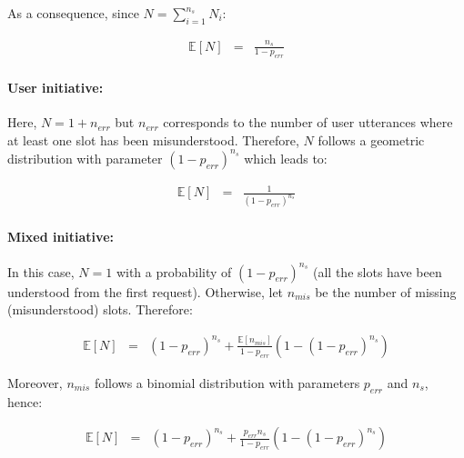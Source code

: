                      As a consequence, since $N = \sum_{i=1}^{n_s} N_i$:

                     \begin{eqnarray}
                       \mathbb{E} [N] & = & \frac{n_s}{1-p_{err}}
                     \end{eqnarray}

                \paragraph{User initiative:} Here, $N = 1 + n_{err}$  but $n_{err}$ corresponds to the number of user utterances where at least one slot has been misunderstood. Therefore, $N$ follows a geometric distribution with parameter $(1-p_{err})^{n_s}$ which leads to:

                     \begin{eqnarray}
                       \mathbb{E} [N] & = & \frac{1}{(1-p_{err})^{n_s}}
                     \end{eqnarray}

                \paragraph{Mixed initiative:} In this case, $N=1$ with a probability of $(1-p_{err})^{n_s}$ (all the slots have been understood from the first request). Otherwise, let $n_{mis}$ be the number of missing (misunderstood) slots. Therefore:

                     \begin{eqnarray}
                       \mathbb{E} [N] & = & (1-p_{err})^{n_s} + \frac{\mathbb{E} [n_{mis}]}{1-p_{err}} (1 - (1-p_{err})^{n_s})
                     \end{eqnarray}

                     Moreover, $n_{mis}$ follows a binomial distribution with parameters $p_{err}$ and $n_s$, hence:

                     \begin{eqnarray}
                       \mathbb{E} [N] & = & (1-p_{err})^{n_s} + \frac{p_{err} n_s}{1-p_{err}} (1 - (1-p_{err})^{n_s})
                     \end{eqnarray}
										
								
								
